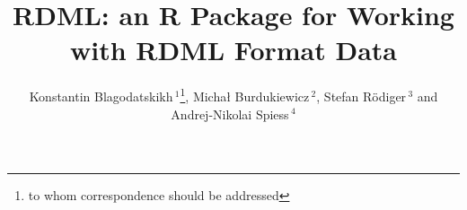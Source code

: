 \documentclass{bioinfo}
\begin{document}
	
\title[RDML]{RDML: an \textbf{R} Package for Working with RDML Format Data}
\author[Blagodatskikh \textit{et~al}]{Konstantin Blagodatskikh\,$^{1}$\footnote{to whom correspondence should be addressed}, Micha\l{} Burdukiewicz\,$^{2}$, Stefan R\"{o}diger\,$^{3}$ 
	and Andrej-Nikolai Spiess\,$^{4}$} 

\address{$^{1}$Evrogen JSC, Moscow, Russia\\ 
	 $^{2}$Department of Genomics, Faculty of Biotechnology, University of Wroc\l{}aw, Wroc\l{}aw, Poland\\
	 $^{3}$Institute of Biotechnology, Brandenburg University of Technology Cottbus--Senftenberg, Senftenberg, Germany\\ 
	 $^{4}$University Medical Center Hamburg-Eppendorf, Hamburg, Germany
	 }
	

	
\maketitle
\end{document}
